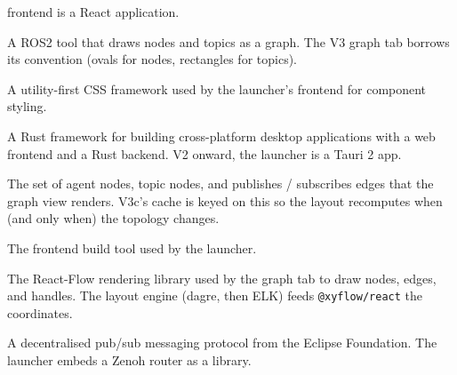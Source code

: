 \documentclass[11pt,a4paper]{article}
\begin{document}
\begin{description}[leftmargin=2.6cm, style=nextline, font=\sffamily\bfseries]
        frontend is a React application.
  \item[\texttt{rqt\_graph}] A ROS2 tool that draws nodes and
        topics as a graph. The V3 graph tab borrows its
        convention (ovals for nodes, rectangles for topics).
  \item[Tailwind] A utility-first CSS framework used by the
        launcher's frontend for component styling.
  \item[Tauri] A Rust framework for building cross-platform
        desktop applications with a web frontend and a Rust
        backend. V2 onward, the launcher is a Tauri 2 app.
  \item[topology] The set of agent nodes, topic nodes, and
        publishes / subscribes edges that the graph view
        renders. V3c's cache is keyed on this so the layout
        recomputes when (and only when) the topology changes.
  \item[Vite] The frontend build tool used by the launcher.
  \item[\texttt{@xyflow/react}] The React-Flow rendering
        library used by the graph tab to draw nodes, edges,
        and handles. The layout engine (dagre, then ELK) feeds
        \texttt{@xyflow/react} the coordinates.
  \item[Zenoh] A decentralised pub/sub messaging protocol from
        the Eclipse Foundation. The launcher embeds a Zenoh
        router as a library.
\end{description}
\end{document}
